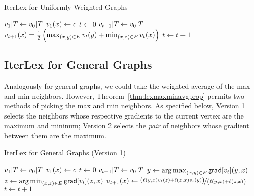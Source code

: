 \documentclass[12pt]{amsart}
\DeclareMathOperator*{\argmin}{arg\,min}
\DeclareMathOperator*{\argmax}{arg\,max}
\newcommand{\grad}{\ensuremath{\mathsf{grad}}}
\begin{document}
\begin{algorithm}
    \caption{IterLex for Uniformly Weighted Graphs}
    \label{alg:iterlexunwtd}
    \begin{algorithmic}[1]
        \State $v_1|T \gets v_0|T$ 
            \State $v_1(x) \gets c$
        \EndFor {}
        \State $t\gets 0$
            \State $v_{t+1}|T \gets v_0|T$
                \State $v_{t+1}(x) = \frac{1}{2}\left({\max_{(x,y)\in E} v_t(y) + \min_{(x,z)\in E} v_t(x)}\right)$
            \EndFor
            \State $t\gets t+1$
        \EndWhile
    \end{algorithmic}
\end{algorithm}

\subsection{IterLex for General Graphs}
Analogously for general graphs, we could take the weighted average of the max and min neighbors. However, Theorem~\ref{thm:lexmaxminavgprop} permits two methods of picking the max and min neighbors. As specified below, Version 1 selects the neighbors whose respective gradients to the current vertex are the maximum and mininum; Version 2 selects the \emph{pair} of neighbors whose gradient between them are the maximum.

\begin{algorithm}
    \caption{IterLex for General Graphs (Version 1)}
    \label{alg:iterlex1}
    \begin{algorithmic}[1]
        \State $v_1|T \gets v_0|T$
            \State $v_1(x) \gets c$
        \EndFor {}
        \State $t\gets 0$
            \State $v_{t+1}|T \gets v_0|T$
                \State $y \gets \argmax_{(x,y)\in E}\grad[\V{v_t}](y,x)$
                \State $z \gets \argmin_{(x,z)\in E}\grad[\V{v_t}](z,x)$
                \State $v_{t+1}(x) \gets \nicefrac{\left({\ell(y,x)v_t(z) + \ell(z,x)v_t(y)}\right)}{\left({\ell(y,x)+\ell(z,x)}\right)}$
            \EndFor
            \State $t\gets t+1$
        \EndWhile
    \end{algorithmic}
\end{algorithm}
\end{document}
